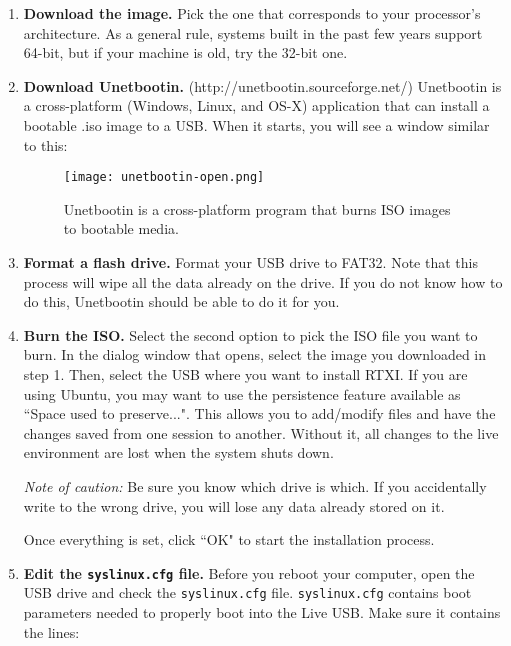 \begin{enumerate}
\item \textbf{Download the image.} Pick the one that corresponds to your processor's architecture. As a general rule, systems built in the past few years support 64-bit, but if your machine is old, try the 32-bit one. 

\item \textbf{Download Unetbootin.} (http://unetbootin.sourceforge.net/) Unetbootin is a cross-platform (Windows, Linux, and OS-X) application that can install a bootable .iso image to a USB. When it starts, you will see a window similar to this:

\begin{figure}[h]
\begin{center}
\texttt{[image: unetbootin-open.png]}
\caption[Unetbootin]{Unetbootin is a cross-platform program that burns ISO images to bootable media.}
\end{center}
\end{figure}

\item \textbf{Format a flash drive.} Format your USB drive to FAT32. Note that this process will wipe all the data already on the drive. If you do not know how to do this, Unetbootin should be able to do it for you. 

\item \textbf{Burn the ISO.} Select the second option to pick the ISO file you want to burn. In the dialog window that opens, select the image you downloaded in step 1. Then, select the USB where you want to install RTXI. If you are using Ubuntu, you may want to use the persistence feature available as ``Space used to preserve...". This allows you to add/modify files and have the changes saved from one session to another. Without it, all changes to the live environment are lost when the system shuts down.

\textit{Note of caution:} Be sure you know which drive is which. If you accidentally write to the wrong drive, you will lose any data already stored on it. 

Once everything is set, click ``OK" to start the installation process. 

\item \textbf{Edit the \texttt{syslinux.cfg} file.} Before you reboot your computer, open the USB drive and check the \texttt{syslinux.cfg} file. \texttt{syslinux.cfg} contains boot parameters needed to properly boot into the Live USB. Make sure it contains the lines: 


\end{enumerate}
